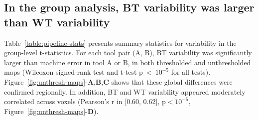 \documentclass[11pt,onecolumn]{article}
\begin{document}
\subsection{In the group analysis, BT variability was larger than WT variability}

Table~\ref{table:pipeline-stats} presents summary statistics for variability in the
group-level t-statistics. For each tool pair (A, B), BT variability was
significantly larger than machine error in tool A or B, in both thresholded
and unthresholded maps (Wilcoxon signed-rank test and t-test p~\textless~$10^{-5}$ for all tests).
Figure~\ref{fig:unthresh-maps}-\textbf{A},\textbf{B},\textbf{C} shows that
these global differences were confirmed regionally.
In addition, BT and WT variability appeared moderately correlated across voxels (Pearson's r
in [0.60, 0.62], p$< 10^{-5}$, Figure~\ref{fig:unthresh-maps}-\textbf{D}). 
\end{document}
